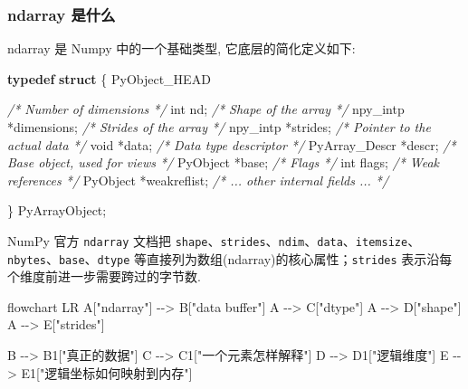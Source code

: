 \documentclass[11pt]{article}
\newenvironment{Shaded}{}{}
\newcommand{\KeywordTok}[1]{\textcolor[rgb]{0.00,0.44,0.13}{\textbf{{#1}}}}
\newcommand{\DataTypeTok}[1]{\textcolor[rgb]{0.56,0.13,0.00}{{#1}}}
\newcommand{\CommentTok}[1]{\textcolor[rgb]{0.38,0.63,0.69}{\textit{{#1}}}}
\newcommand{\NormalTok}[1]{{#1}}
\newcommand{\OperatorTok}[1]{\textcolor[rgb]{0.40,0.40,0.40}{{#1}}}
\begin{document}
\subsubsection{ndarray 是什么}\label{ndarray-ux662fux4ec0ux4e48}

ndarray 是 Numpy 中的一个基础类型, 它底层的简化定义如下:

\begin{Shaded}
\begin{Highlighting}[]
\KeywordTok{typedef} \KeywordTok{struct} \OperatorTok{\{}
\NormalTok{    PyObject\_HEAD}

    \CommentTok{/* Number of dimensions */}
    \DataTypeTok{int}\NormalTok{ nd}\OperatorTok{;}
    \CommentTok{/* Shape of the array */}
\NormalTok{    npy\_intp }\OperatorTok{*}\NormalTok{dimensions}\OperatorTok{;}
    \CommentTok{/* Strides of the array */}
\NormalTok{    npy\_intp }\OperatorTok{*}\NormalTok{strides}\OperatorTok{;}
    \CommentTok{/* Pointer to the actual data */}
    \DataTypeTok{void} \OperatorTok{*}\NormalTok{data}\OperatorTok{;}
    \CommentTok{/* Data type descriptor */}
\NormalTok{    PyArray\_Descr }\OperatorTok{*}\NormalTok{descr}\OperatorTok{;}
    \CommentTok{/* Base object, used for views */}
\NormalTok{    PyObject }\OperatorTok{*}\NormalTok{base}\OperatorTok{;}
    \CommentTok{/* Flags */}
    \DataTypeTok{int}\NormalTok{ flags}\OperatorTok{;}
    \CommentTok{/* Weak references */}
\NormalTok{    PyObject }\OperatorTok{*}\NormalTok{weakreflist}\OperatorTok{;}
    \CommentTok{/* ... other internal fields ... */}

\OperatorTok{\}}\NormalTok{ PyArrayObject}\OperatorTok{;}
\end{Highlighting}
\end{Shaded}

NumPy 官方 \texttt{ndarray} 文档把
\texttt{shape}、\texttt{strides}、\texttt{ndim}、\texttt{data}、\texttt{itemsize}、\texttt{nbytes}、\texttt{base}、\texttt{dtype}
等直接列为数组(ndarray)的核心属性；\texttt{strides}
表示沿每个维度前进一步需要跨过的字节数.

\begin{Shaded}
\begin{Highlighting}[]
\NormalTok{flowchart LR}
\NormalTok{    A["ndarray"] {-}{-}\textgreater{} B["data buffer"]}
\NormalTok{    A {-}{-}\textgreater{} C["dtype"]}
\NormalTok{    A {-}{-}\textgreater{} D["shape"]}
\NormalTok{    A {-}{-}\textgreater{} E["strides"]}

\NormalTok{    B {-}{-}\textgreater{} B1["真正的数据"]}
\NormalTok{    C {-}{-}\textgreater{} C1["一个元素怎样解释"]}
\NormalTok{    D {-}{-}\textgreater{} D1["逻辑维度"]}
\NormalTok{    E {-}{-}\textgreater{} E1["逻辑坐标如何映射到内存"]}
\end{Highlighting}
\end{Shaded}
\end{document}
